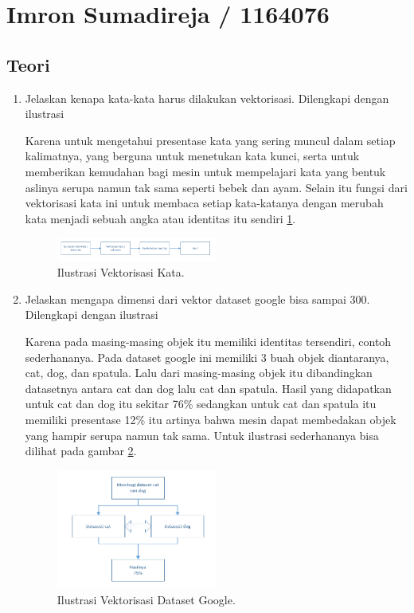 \section{Imron Sumadireja / 1164076}
\subsection{Teori}
\begin{enumerate}
\item Jelaskan kenapa kata-kata harus dilakukan vektorisasi. Dilengkapi dengan ilustrasi \par
Karena untuk mengetahui presentase kata yang sering muncul dalam setiap kalimatnya, yang berguna untuk menetukan kata kunci, serta untuk memberikan kemudahan bagi mesin untuk mempelajari kata yang bentuk aslinya serupa namun tak sama seperti bebek dan ayam. Selain itu fungsi dari vektorisasi kata ini untuk membaca setiap kata-katanya dengan merubah kata menjadi sebuah angka atau identitas itu sendiri \ref{vek1}.
		\begin{figure}[ht]
		\centerline{\includegraphics[width=0.5\textwidth]{figures/im/vek1.png}}
		\caption{Ilustrasi Vektorisasi Kata.}
		\label{vek1}
		\end{figure}

\item Jelaskan mengapa dimensi dari vektor dataset google bisa sampai 300. Dilengkapi dengan ilustrasi \par
Karena pada masing-masing objek itu memiliki identitas tersendiri, contoh sederhananya. Pada dataset google ini memiliki 3 buah objek diantaranya, cat, dog, dan spatula. Lalu dari masing-masing objek itu dibandingkan datasetnya antara cat dan dog lalu cat dan spatula. Hasil yang didapatkan untuk cat dan dog itu sekitar 76\% sedangkan untuk cat dan spatula itu memiliki presentase 12\% itu artinya bahwa mesin dapat membedakan objek yang hampir serupa namun tak sama. Untuk ilustrasi sederhananya bisa dilihat pada gambar \ref{vek2}.
		\begin{figure}[ht]
		\centerline{\includegraphics[width=0.5\textwidth]{figures/im/vek2.png}}
		\caption{Ilustrasi Vektorisasi Dataset Google.}
		\label{vek2}
		\end{figure}


\end{enumerate}
